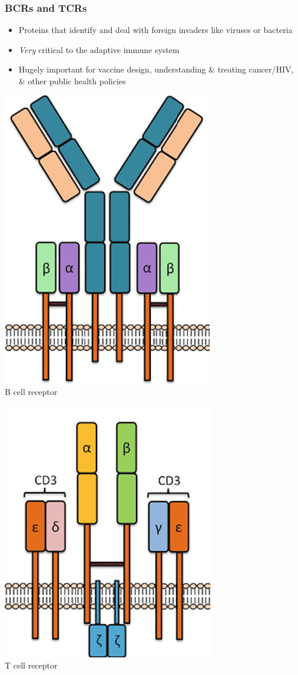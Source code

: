 \documentclass[mathserif,compress]{beamer}
\renewcommand\;{\,}
\begin{document}
\begin{frame}\frametitle{BCRs and TCRs}
\begin{minipage}{0.49\linewidth}
\begin{itemize}
\item
Proteins that identify and deal with foreign invaders like viruses or bacteria
\bigskip
\item
\emph{Very} critical to the adaptive immune system
\bigskip
\item
Hugely important for vaccine design, understanding \& treating cancer/HIV, \& other public health policies
\end{itemize}
\end{minipage}
\begin{minipage}{0.49\linewidth}
\begin{center}
\includegraphics[width=0.4\linewidth]{Images/BCR.png}
\\
\small
B cell receptor
\end{center}
\begin{center}
\includegraphics[width=0.4\linewidth]{Images/TCR.png}
\\
\small
T cell receptor
\end{center}
\end{minipage}
\end{frame}
\end{document}
